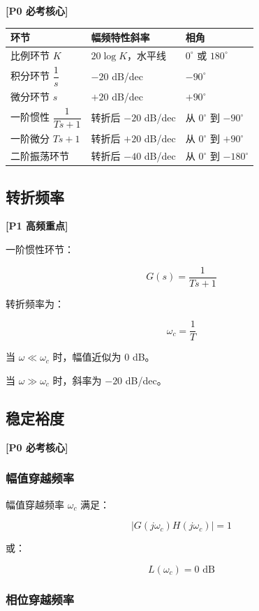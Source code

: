 \documentclass[UTF8,a4paper,12pt]{ctexart}
\newcommand{\Pzero}{\textcolor{p0}{\textbf{[P0 必考核心]}}}
\newcommand{\Pone}{\textcolor{p1}{\textbf{[P1 高频重点]}}}
\begin{document}
\Pzero

\begin{longtable}{p{4cm}p{5cm}p{5cm}}
\toprule
环节 & 幅频特性斜率 & 相角 \\
\midrule
比例环节 $K$ & $20\log K$，水平线 & $0^\circ$ 或 $180^\circ$ \\
积分环节 $\dfrac{1}{s}$ & $-20$ dB/dec & $-90^\circ$ \\
微分环节 $s$ & $+20$ dB/dec & $+90^\circ$ \\
一阶惯性 $\dfrac{1}{Ts+1}$ & 转折后 $-20$ dB/dec & 从 $0^\circ$ 到 $-90^\circ$ \\
一阶微分 $Ts+1$ & 转折后 $+20$ dB/dec & 从 $0^\circ$ 到 $+90^\circ$ \\
二阶振荡环节 & 转折后 $-40$ dB/dec & 从 $0^\circ$ 到 $-180^\circ$ \\
\bottomrule
\end{longtable}

\subsection{转折频率}

\Pone

一阶惯性环节：

\[
G(s)=\frac{1}{Ts+1}
\]

转折频率为：

\[
\omega_c=\frac{1}{T}
\]

当 $\omega \ll \omega_c$ 时，幅值近似为 $0$ dB。

当 $\omega \gg \omega_c$ 时，斜率为 $-20$ dB/dec。

\subsection{稳定裕度}

\Pzero

\subsubsection{幅值穿越频率}

幅值穿越频率 $\omega_c$ 满足：

\[
|G(j\omega_c)H(j\omega_c)|=1
\]

或：

\[
L(\omega_c)=0\text{ dB}
\]

\subsubsection{相位穿越频率}
\end{document}
